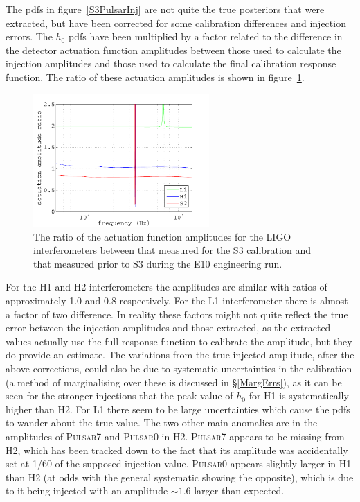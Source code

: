 The pdfs in figure~\ref{S3PulsarInj} are not quite the true posteriors that were extracted, but
have been corrected for some calibration differences and injection errors. The $h_0$ pdfs have been
multiplied by a factor related to the difference in the detector actuation function amplitudes
between those used to calculate the injection amplitudes and those used to calculate the final
calibration response function. The ratio of these actuation amplitudes is shown in
figure~\ref{S3ActuationRatio}.
\begin{figure}[!htbp]
\begin{center}
\includegraphics[width=0.6\textwidth]{figs/S3ActuationRatio}\caption[The ratio of the actuation
function amplitudes for the LIGO interferometers.]{The ratio of the actuation function amplitudes
for the LIGO interferometers between that measured for the S3 calibration and that measured prior to
S3 during the E10 engineering run.}\label{S3ActuationRatio}
\end{center}
\end{figure}
For the H1 and H2 interferometers the amplitudes are similar with ratios of approximately 1.0 and
0.8 respectively. For the L1 interferometer there is almost a factor of two difference. In reality
these factors might not quite reflect the true error between the injection amplitudes and those
extracted, as the extracted values actually use the full response function to calibrate the
amplitude, but they do provide an estimate. The variations from the true injected amplitude,
after the above corrections, could also be due to systematic uncertainties in the calibration (a
method of marginalising over these is discussed in \S\ref{MargErrs}), as it can be seen for the
stronger injections that the peak value of $h_0$ for H1 is systematically higher than H2. For L1
there seem to be large uncertainties which cause the pdfs to wander about the true value. The two
other main anomalies are in the amplitudes of P\textsc{ulsar}7 and P\textsc{ulsar}0 in H2.
P\textsc{ulsar}7 appears to be missing from H2, which has been tracked down to the fact that its
amplitude was accidentally set at 1/60 of the supposed injection value. P\textsc{ulsar}0 appears
slightly larger in H1 than H2 (at odds with the general systematic showing the opposite), which is
due to it being injected with an amplitude $\sim 1.6$ larger than expected.

